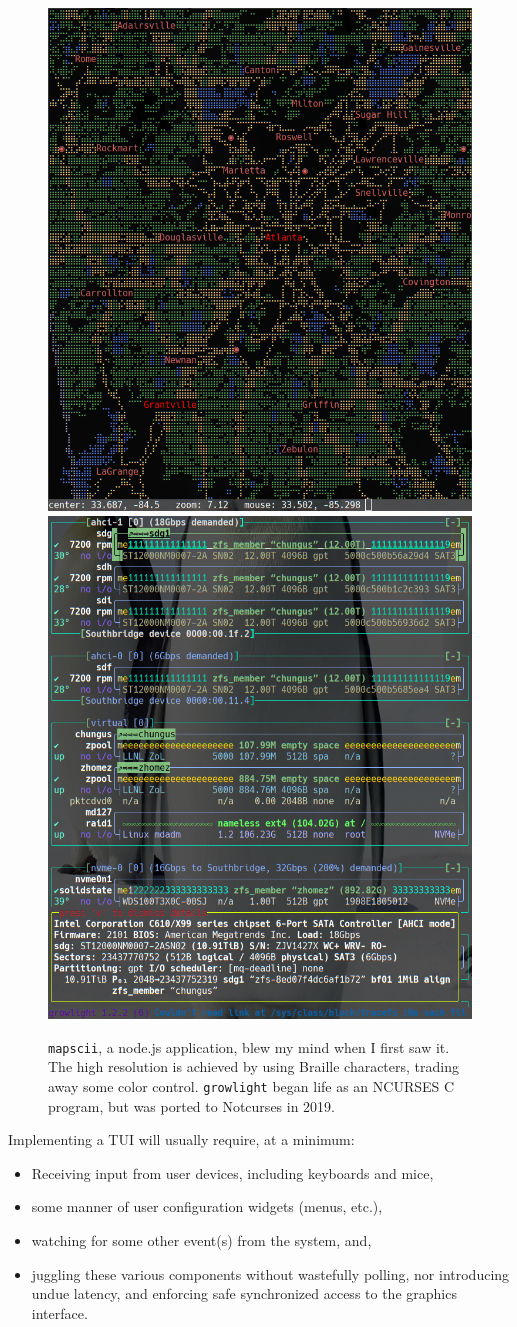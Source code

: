 \documentclass[letterpaper,10pt]{article}
\newenvironment{denseitemize}{
  \begin{itemize}
      \setlength{\itemsep}{0pt}
}{
  \end{itemize}
}
\begin{document}
\begin{figure}[!htbp] \centering
    \includegraphics[width=.4\linewidth]{media/tui-mapscii.png}
    \hfill
    \includegraphics[width=.4\linewidth]{media/tui-growlight.png}
    \caption[Non-NCURSES TUIs: Mapscii and Growlight.]{\texttt{mapscii}, a
    node.js application, blew my mind when I first saw it. The high resolution
    is achieved by using Braille characters, trading away some color control.
    \texttt{growlight} began life as an NCURSES C program, but was ported to
    Notcurses in 2019.}
  \label{fig:notncurses-tuis}
\end{figure}

Implementing a TUI will usually require, at a minimum:
\begin{denseitemize}
\item{Receiving input from user devices, including keyboards and mice,}
\item{some manner of user configuration widgets (menus, etc.),}
\item{watching for some other event(s) from the system, and},
\item{juggling these various components without wastefully polling, nor
       introducing undue latency, and enforcing safe synchronized access to
       the graphics interface.}
\end{denseitemize}
\end{document}
